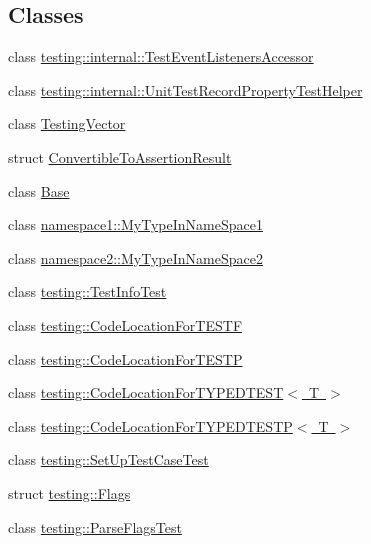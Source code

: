 \subsection*{Classes}
\begin{DoxyCompactItemize}
\item 
class \mbox{\hyperlink{classtesting_1_1internal_1_1_test_event_listeners_accessor}{testing\+::internal\+::\+Test\+Event\+Listeners\+Accessor}}
\item 
class \mbox{\hyperlink{classtesting_1_1internal_1_1_unit_test_record_property_test_helper}{testing\+::internal\+::\+Unit\+Test\+Record\+Property\+Test\+Helper}}
\item 
class \mbox{\hyperlink{class_testing_vector}{Testing\+Vector}}
\item 
struct \mbox{\hyperlink{struct_convertible_to_assertion_result}{Convertible\+To\+Assertion\+Result}}
\item 
class \mbox{\hyperlink{class_base}{Base}}
\item 
class \mbox{\hyperlink{classnamespace1_1_1_my_type_in_name_space1}{namespace1\+::\+My\+Type\+In\+Name\+Space1}}
\item 
class \mbox{\hyperlink{classnamespace2_1_1_my_type_in_name_space2}{namespace2\+::\+My\+Type\+In\+Name\+Space2}}
\item 
class \mbox{\hyperlink{classtesting_1_1_test_info_test}{testing\+::\+Test\+Info\+Test}}
\item 
class \mbox{\hyperlink{classtesting_1_1_code_location_for_t_e_s_t_f}{testing\+::\+Code\+Location\+For\+T\+E\+S\+TF}}
\item 
class \mbox{\hyperlink{classtesting_1_1_code_location_for_t_e_s_t_p}{testing\+::\+Code\+Location\+For\+T\+E\+S\+TP}}
\item 
class \mbox{\hyperlink{classtesting_1_1_code_location_for_t_y_p_e_d_t_e_s_t}{testing\+::\+Code\+Location\+For\+T\+Y\+P\+E\+D\+T\+E\+S\+T$<$ T $>$}}
\item 
class \mbox{\hyperlink{classtesting_1_1_code_location_for_t_y_p_e_d_t_e_s_t_p}{testing\+::\+Code\+Location\+For\+T\+Y\+P\+E\+D\+T\+E\+S\+T\+P$<$ T $>$}}
\item 
class \mbox{\hyperlink{classtesting_1_1_set_up_test_case_test}{testing\+::\+Set\+Up\+Test\+Case\+Test}}
\item 
struct \mbox{\hyperlink{structtesting_1_1_flags}{testing\+::\+Flags}}
\item 
class \mbox{\hyperlink{classtesting_1_1_parse_flags_test}{testing\+::\+Parse\+Flags\+Test}}
\item 

\end{DoxyCompactItemize}

